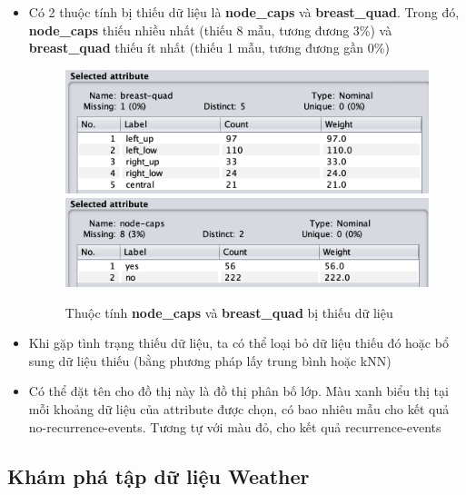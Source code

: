 \documentclass[a4paper, 12pt]{article}
\begin{document}
\begin{itemize}
\begin{itemize}
        \item Có 2 thuộc tính bị thiếu dữ liệu là \textbf{node\_caps} và \textbf{breast\_quad}. Trong đó, \textbf{node\_caps} thiếu nhiều nhất (thiếu 8 mẫu, tương đương 3\%) và \textbf{breast\_quad} thiếu ít nhất (thiếu 1 mẫu, tương đương gần 0\%)
        \begin{figure}[H]
            \begin{center}
                \includegraphics[scale = 0.65]{images/breast_quad_missingData.png}
                \includegraphics[scale = 0.65]{images/node_caps_missingData.png}
                \caption{Thuộc tính \textbf{node\_caps} và \textbf{breast\_quad} bị thiếu dữ liệu}
            \end{center}
        \end{figure}

        \item Khi gặp tình trạng thiếu dữ liệu, ta có thể loại bỏ dữ liệu thiếu đó hoặc bổ sung dữ liệu thiếu (bằng phương pháp lấy trung bình hoặc kNN)
        \item Có thể đặt tên cho đồ thị này là đồ thị phân bố lớp. Màu xanh biểu thị tại mỗi khoảng dữ liệu của attribute được chọn, có bao nhiêu mẫu cho kết quả no-recurrence-events. Tương tự với màu đỏ, cho kết quả recurrence-events
    \end{itemize}
\end{itemize}

\subsection{Khám phá tập dữ liệu Weather}
\end{document}
